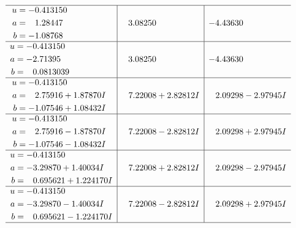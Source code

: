 \documentclass[1p]{elsarticle_modified}
\theoremstyle{definition}
\begin{document}
$$\begin{array}{c|c|c}
 \hline 
\begin{aligned}
u &= -0.413150\phantom{ +0.000000I} \\
a &= \phantom{-}1.28447\phantom{ +0.000000I} \\
b &= -1.08768\phantom{ +0.000000I}\end{aligned}
 & \phantom{-}3.08250\phantom{ +0.000000I} & -4.43630\phantom{ +0.000000I} \\ \hline\begin{aligned}
u &= -0.413150\phantom{ +0.000000I} \\
a &= -2.71395\phantom{ +0.000000I} \\
b &= \phantom{-}0.0813039\phantom{ +0.000000I}\end{aligned}
 & \phantom{-}3.08250\phantom{ +0.000000I} & -4.43630\phantom{ +0.000000I} \\ \hline\begin{aligned}
u &= -0.413150\phantom{ +0.000000I} \\
a &= \phantom{-}2.75916 + 1.87870 I \\
b &= -1.07546 + 1.08432 I\end{aligned}
 & \phantom{-}7.22008 + 2.82812 I & \phantom{-}2.09298 - 2.97945 I \\ \hline\begin{aligned}
u &= -0.413150\phantom{ +0.000000I} \\
a &= \phantom{-}2.75916 - 1.87870 I \\
b &= -1.07546 - 1.08432 I\end{aligned}
 & \phantom{-}7.22008 - 2.82812 I & \phantom{-}2.09298 + 2.97945 I \\ \hline\begin{aligned}
u &= -0.413150\phantom{ +0.000000I} \\
a &= -3.29870 + 1.40034 I \\
b &= \phantom{-}0.695621 + 1.224170 I\end{aligned}
 & \phantom{-}7.22008 + 2.82812 I & \phantom{-}2.09298 - 2.97945 I \\ \hline\begin{aligned}
u &= -0.413150\phantom{ +0.000000I} \\
a &= -3.29870 - 1.40034 I \\
b &= \phantom{-}0.695621 - 1.224170 I\end{aligned}
 & \phantom{-}7.22008 - 2.82812 I & \phantom{-}2.09298 + 2.97945 I\\
 \hline 
 \end{array}$$\newpage
\newpage\renewcommand{\arraystretch}{1}
\end{document}
